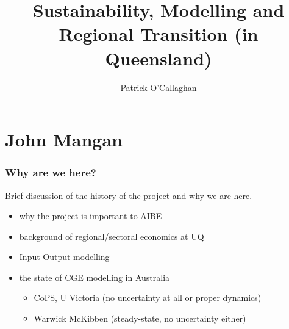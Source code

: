 \documentclass[handout,english]{beamer}
\title{Sustainability, Modelling and Regional Transition (in Queensland)}
\author[Patrick O'Callaghan]{Patrick O'Callaghan}
\institute{AIBE, The University of Queensland\\
\today}
\date{}
\begin{document}
\maketitle
\section{John Mangan}
\begin{frame}
  \frametitle{Why are we here?}
  Brief discussion of the history of the project and why we are here.
  \begin{itemize}
    \item why the project is important to AIBE\\
    \item background of regional/sectoral economics at UQ\\
    \item Input-Output modelling\\
    \item the state of CGE modelling in Australia\\
    \begin{itemize}
      \item CoPS, U Victoria (no uncertainty at all or proper dynamics)\\
      \item Warwick McKibben (steady-state, no uncertainty either)\\
    \end{itemize}
  \end{itemize}
\end{frame}
\end{document}
